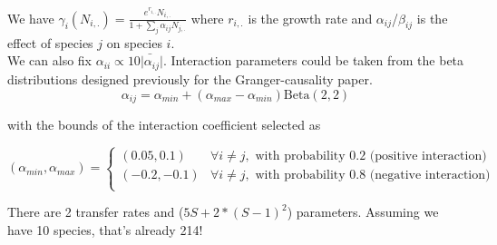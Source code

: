 \documentclass[a4paper,10pt]{article}
\begin{document}
 We have $\gamma_i(N_{i,.})=\frac{e^{r_{i,.}}N_{i,.}}{1+\sum_j\alpha_{ij}N_{j,.}}$ where $r_{i,.}$ is the growth rate and $\alpha_{ij}$/$\beta_{ij}$ is the effect of species $j$ on species $i$. \\
 
 We can also fix $\alpha_{ii}\propto10\bar{|\alpha_{ij}}|$. Interaction parameters could be taken from the beta distributions designed previously for the Granger-causality paper.\\
 \begin{equation}
\alpha_{ij}=\alpha_{min}+(\alpha_{max}-\alpha_{min})\text{Beta}(2,2)\label{eq:coef}
\end{equation}

with the bounds of the interaction coefficient selected as

\begin{equation}
(\alpha_{min},\alpha_{max})=\begin{cases}
(0.05,0.1) & \forall i\neq j,\text{ with probability 0.2 (positive interaction)}\\
(-0.2,-0.1) & \forall i\neq j,\text{ with probability 0.8 (negative interaction)}\\
\end{cases}\label{eq:coef_condition}
\end{equation}

 
 
 There are 2 transfer rates and ($5S + 2*(S-1)^2$) parameters. Assuming we have 10 species, that's already 214!
   
\end{document}
